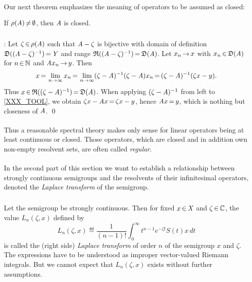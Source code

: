 \documentclass[11pt,twoside]{article}
\begin{document}
\paragraph{}
Our next theorem emphasizes the meaning of operators to be assumed as closed:

\begin{theorem}
If $\rho(\mathit{A})\,{\neq}\,\emptyset$, then $\mathit{A}$ is closed.
\end{theorem}

\subparagraph{}
\Proof:
Let $\zeta {\,\in\,} \rho(\mathit{A})$ such that
$\mathit{A}-\zeta$ is bijective with domain of definition
$\mathfrak{D}((\mathit{A}-\zeta)^{-1}) {\,=\,} \mathit{Y}$ and range
$\mathfrak{R}((\mathit{A}-\zeta)^{-1}) {\,=\,} \mathfrak{D}(\mathit{A})$.
Let $x_n {\,\to\,} x$ with $x_n {\,\in\,} \mathfrak{D}(\mathit{A})$ for $n {\,\in\,} {\mathbb{N}}$
and $\mathit{A} x_n {\,\to\,} y$.
Then
\begin{equation}\label{XXX_TOOL}
x {\,=\,} \lim_{n \to \infty} x_n {\,=\,}
\lim_{n \to \infty} (\zeta-\mathit{A})^{-1}(\zeta-\mathit{A}) x_n {\,=\,}
(\zeta-\mathit{A})^{-1}(\zeta x-y).
\end{equation}
Thus $x {\,\in\,} \mathfrak{R}((\zeta-\mathit{A})^{-1}) {\,=\,} \mathfrak{D}(\mathit{A})$.
When applying $(\zeta-\mathit{A})^{-1}$ from left to \eqref{XXX_TOOL},
we obtain $\zeta x -\mathit{A} x {\,=\,} \zeta x -y$,
hence $\mathit{A} x {\,=\,} y$,
which is nothing but closeness of $\mathit{A}$.
\qed

\paragraph{}
Thus a reasonable spectral theory makes only sense
for linear operators being at least continuous or closed.
Those operators,
which are closed and in addition own non-empty resolvent sets,
are often called \textit{regular}.

\paragraph{} %
In the second part of this section we want to establish a relationship between
strongly continuous semigroups and the resolvents of their infinitesimal operators,
denoted the \textit{Laplace transform} of the semigroup.

\subparagraph{}
Let the semigroup {\SG} be strongly continuous.
Then for fixed $x {\,\in\,} \mathit{X}$ and $\zeta {\,\in\,} {\mathbb{C}}$,
the value $L_n(\zeta,x)$ defined by
\begin{equation}\label{LAPLACE}
L_n(\zeta,x) \eqdef
\frac{1}{(n-1)!} \int_{\,0}^{\infty} t^{n-1}e^{-\zeta t}S(t)x \,dt
\end{equation}
is called the (right side) \textit{Laplace transform} of order $n$
of the semigroup {\wrt} $x$ and $\zeta$.
The expressions have to be understood as
improper vector-valued Riemann integrals.
But we cannot expect that $L_n(\zeta,x)$ exists without further assumptions.
\end{document}
